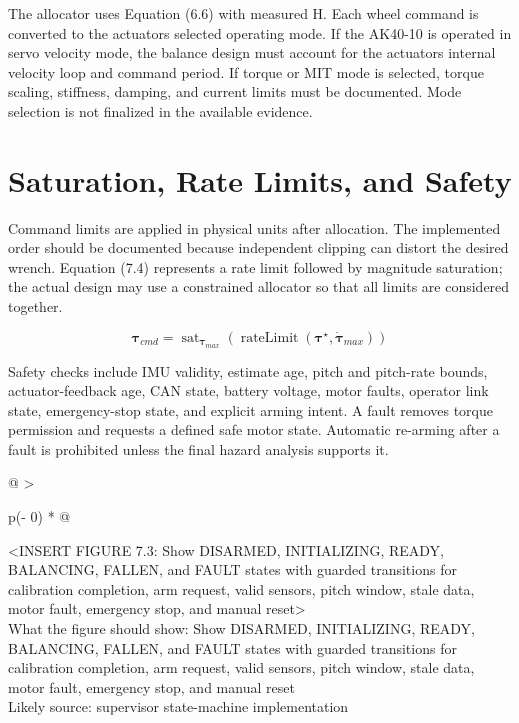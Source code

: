 The allocator uses Equation (6.6) with measured H. Each wheel command is
converted to the actuator\textquotesingle s selected operating mode. If
the AK40-10 is operated in servo velocity mode, the balance design must
account for the actuator\textquotesingle s internal velocity loop and
command period. If torque or MIT mode is selected, torque scaling,
stiffness, damping, and current limits must be documented. Mode
selection is not finalized in the available evidence.

\section{Saturation, Rate Limits, and Safety}\label{saturation-rate-limits-and-safety}

Command limits are applied in physical units after allocation. The
implemented order should be documented because independent clipping can
distort the desired wrench. Equation (7.4) represents a rate limit
followed by magnitude saturation; the actual design may use a
constrained allocator so that all limits are considered together.

\begin{equation}
\boldsymbol{\tau}_{cmd}=\operatorname{sat}_{\boldsymbol{\tau}_{max}}
\left(\operatorname{rateLimit}\left(\boldsymbol{\tau}^{\star},\dot{\boldsymbol{\tau}}_{max}\right)\right)
\label{eq:7-4}
\end{equation}

Safety checks include IMU validity, estimate age, pitch and pitch-rate
bounds, actuator-feedback age, CAN state, battery voltage, motor faults,
operator link state, emergency-stop state, and explicit arming intent. A
fault removes torque permission and requests a defined safe motor state.
Automatic re-arming after a fault is prohibited unless the final hazard
analysis supports it.

\begin{longtable}[]{@{}
  >{\raggedright\arraybackslash}p{(\columnwidth - 0\tabcolsep) * }@{}}
\toprule\noalign{}
\begin{minipage}[b]{\linewidth}\raggedright
\textless INSERT FIGURE 7.3: Show DISARMED, INITIALIZING, READY,
BALANCING, FALLEN, and FAULT states with guarded transitions for
calibration completion, arm request, valid sensors, pitch window, stale
data, motor fault, emergency stop, and manual reset\textgreater{}\\
What the figure should show: Show DISARMED, INITIALIZING, READY,
BALANCING, FALLEN, and FAULT states with guarded transitions for
calibration completion, arm request, valid sensors, pitch window, stale
data, motor fault, emergency stop, and manual reset\\
Likely source: supervisor state-machine implementation\strut
\end{minipage} \\
\midrule\noalign{}
\endhead
\bottomrule\noalign{}
\endlastfoot
\end{longtable}

